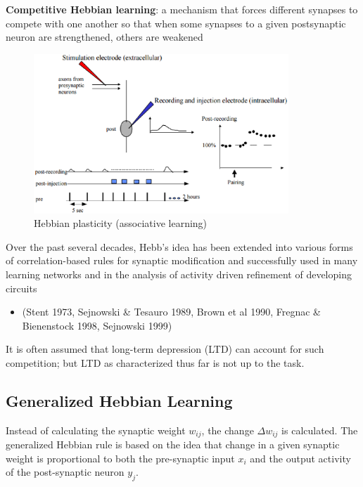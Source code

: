 {\bf Competitive Hebbian learning}:  a mechanism that forces different synapses
to compete with one another so that when some synapses to a given postsynaptic
neuron are strengthened, others are weakened
\citep{guillery1972, miller1996, song2000}


\begin{figure}[htbp]
  \centerline{\includegraphics[height=6cm]{./images/Hebbian_plasticity.eps}}
  \caption{Hebbian plasticity (associative
  learning)}\label{fig:Hebbian_plasticity}
\end{figure}

Over the past several decades, Hebb's idea has been extended into various forms
of correlation-based rules for synaptic modification and successfully used in
many learning networks and in the analysis of activity driven refinement of
developing circuits
\begin{itemize}
  \item (Stent 1973, Sejnowski \& Tesauro 1989, Brown et al 1990, Fregnac \&
  Bienenstock 1998, Sejnowski 1999)
\end{itemize}



It is often assumed that long-term depression (LTD) can account for such
competition; but LTD as characterized thus far is not up to the task.


\subsection{Generalized Hebbian Learning}
\label{sec:Hebbian-generalized}

Instead of calculating the synaptic weight $w_{ij}$, the change $\Delta
w_{ij}$ is calculated. The generalized Hebbian rule is based on the idea that
change in a given synaptic weight is proportional to both the pre-synaptic input
$x_i$ and the output activity of the post-synaptic neuron $y_j$.

